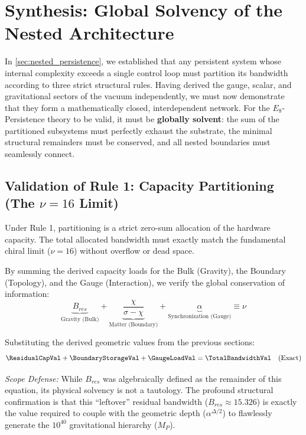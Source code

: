 
\section{Synthesis: Global Solvency of the Nested Architecture}
\label{sec:Synthesis}

In \cref{sec:nested_persistence}, we established that any persistent system whose internal complexity exceeds a single control loop must partition its bandwidth according to three strict structural rules. Having derived the gauge, scalar, and gravitational sectors of the vacuum independently, we must now demonstrate that they form a mathematically closed, interdependent network. For the $E_8$-Persistence theory to be valid, it must be \textbf{globally solvent}: the sum of the partitioned subsystems must perfectly exhaust the substrate, the minimal structural remainders must be conserved, and all nested boundaries must seamlessly connect.

\subsection{Validation of Rule 1: Capacity Partitioning (The \texorpdfstring{$\nu=16$}{nu=16} Limit)}
Under Rule 1, partitioning is a strict zero-sum allocation of the hardware capacity. The total allocated bandwidth must exactly match the fundamental chiral limit ($\nu = 16$) without overflow or dead space. 

By summing the derived capacity loads for the Bulk (Gravity), the Boundary (Topology), and the Gauge (Interaction), we verify the global conservation of information:
\begin{equation}
\underbrace{B_{res}}_{\text{Gravity (Bulk)}} + \underbrace{\frac{\chi}{\sigma-\chi}}_{\text{Matter (Boundary)}} + \underbrace{\alpha}_{\text{Synchronization (Gauge)}} \equiv \nu
\end{equation}

Substituting the derived geometric values from the previous sections:
\begin{equation}
\ResidualCapVal + \BoundaryStorageVal + \GaugeLoadVal = \TotalBandwidthVal \quad (\text{Exact})
\end{equation}

\textit{Scope Defense:} While $B_{res}$ was algebraically defined as the remainder of this equation, its physical solvency is not a tautology. The profound structural confirmation is that this ``leftover'' residual bandwidth ($B_{res} \approx 15.326$) is exactly the value required to couple with the geometric depth ($\alpha^{\Delta/2}$) to flawlessly generate the $10^{40}$ gravitational hierarchy ($M_P$).

